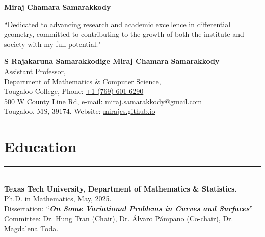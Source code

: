 \documentclass[12pt]{book}
\begin{document}
\pagestyle{fancy}
\thispagestyle{empty}
\begin{center}
\textbf{\Huge{Miraj Chamara Samarakkody}}\\
\end{center}

``Dedicated to advancing research and academic excellence in differential geometry, committed to contributing to the growth of both the institute and society with my full potential."\\
\vspace{0.05in}

\noindent \textbf{S Rajakaruna Samarakkodige Miraj Chamara Samarakkody}\\
Assistant Professor,  \\
Department of Mathematics \& Computer Science,    \\
Tougaloo College, \hfill Phone: \href{tel:+17696016290}{+1 (769) 601 6290}\\
500 W County Line Rd,  \hfill e-mail: \href{mailto:miraj.samarakkody@gmail.com}{miraj.samarakkody@gmail.com}\\
Tougaloo, MS, 39174.  \hfill Website: \href{https://mirajcs.github.io/}{mirajcs.github.io}\\



\section*{Education} \rule{\textwidth}{1pt}\\

\noindent \textbf{Texas Tech University, Department of Mathematics \& Statistics.}\\
Ph.D. in Mathematics, May, 2025. \\
Dissertation: ``\textit{\textbf{On Some Variational Problems in Curves and Surfaces}}''\\
Committee:  \href{https://www.myweb.ttu.edu/tra97432/}{Dr. Hung Tran} (Chair), \href{https://www.math.ttu.edu/~apampano/}{Dr. \'Alvaro P\'ampano} (Co-chair), \href{https://www.math.ttu.edu/~mtoda/}{Dr. Magdalena Toda}.\\
\end{document}
